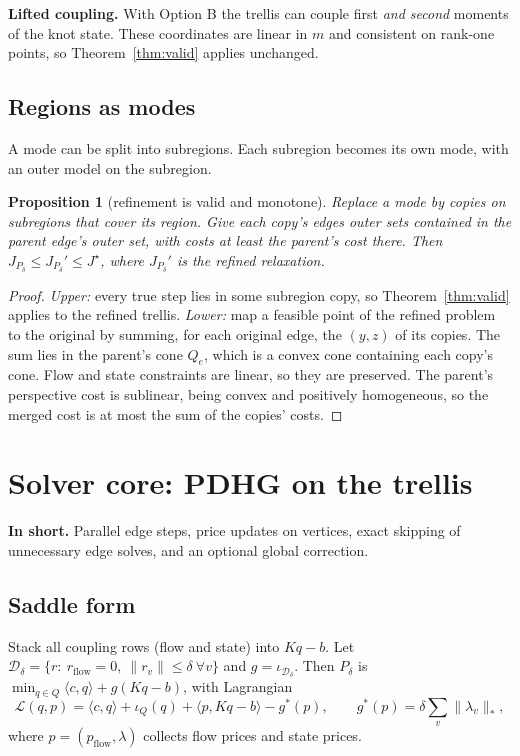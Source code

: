 \documentclass[11pt]{article}
\newcommand{\Pd}{P_\delta}
\newcommand{\Jd}{J_{P_\delta}}
\newcommand{\inshort}[1]{\par\noindent\textcolor{accent}{\textbf{In short.}} #1\par\smallskip}
\theoremstyle{plain}
\newtheorem{proposition}[theorem]{Proposition}
\theoremstyle{definition}
\theoremstyle{remark}
\begin{document}
\textbf{Lifted coupling.} With Option B the trellis can couple first \emph{and second} moments of the knot state. These coordinates are linear in $m$ and consistent on rank-one points, so Theorem~\ref{thm:valid} applies unchanged.

\subsection{Regions as modes}
A mode can be split into subregions. Each subregion becomes its own mode, with an outer model on the subregion.

\begin{proposition}[refinement is valid and monotone]\label{prop:refine}
Replace a mode by copies on subregions that cover its region. Give each copy's edges outer sets contained in the parent edge's outer set, with costs at least the parent's cost there. Then $\Jd\le\Jd'\le J^\star$, where $\Jd'$ is the refined relaxation.
\end{proposition}
\begin{proof}
\emph{Upper:} every true step lies in some subregion copy, so Theorem~\ref{thm:valid} applies to the refined trellis. \emph{Lower:} map a feasible point of the refined problem to the original by summing, for each original edge, the $(y,z)$ of its copies. The sum lies in the parent's cone $Q_e$, which is a convex cone containing each copy's cone. Flow and state constraints are linear, so they are preserved. The parent's perspective cost is sublinear, being convex and positively homogeneous, so the merged cost is at most the sum of the copies' costs.
\end{proof}

\section{Solver core: PDHG on the trellis}\label{sec:solver}
\inshort{Parallel edge steps, price updates on vertices, exact skipping of unnecessary edge solves, and an optional global correction.}

\subsection{Saddle form}
Stack all coupling rows (flow and state) into $Kq-b$. Let $\mathcal D_\delta=\{r:\ r_{\mathrm{flow}}=0,\ \|r_v\|\le\delta\ \forall v\}$ and $g=\iota_{\mathcal D_\delta}$. Then $\Pd$ is $\min_{q\in Q}\langle c,q\rangle+g(Kq-b)$, with Lagrangian
\[
\mathcal L(q,p)=\langle c,q\rangle+\iota_Q(q)+\langle p,Kq-b\rangle-g^*(p),\qquad g^*(p)=\delta\sum_v\|\lambda_v\|_*,
\]
where $p=(p_{\mathrm{flow}},\lambda)$ collects flow prices and state prices.
\end{document}
